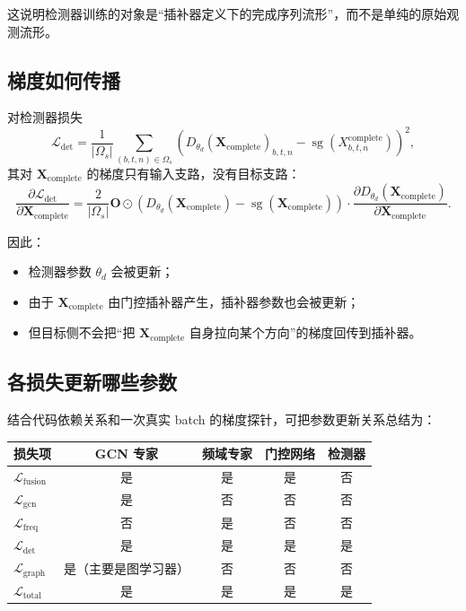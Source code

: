 \documentclass[UTF8]{ctexart}
\newcommand{\sg}{\operatorname{sg}}
\begin{document}
这说明检测器训练的对象是“插补器定义下的完成序列流形”，而不是单纯的原始观测流形。

\subsection{梯度如何传播}

对检测器损失
\begin{equation}
    \mathcal{L}_{\text{det}}
    =
    \frac{1}{|\Omega_s|}
    \sum_{(b,t,n)\in \Omega_s}
    \left(
        D_{\theta_d}(\bm{X}_{\text{complete}})_{b,t,n}
        -
        \sg(X^{\text{complete}}_{b,t,n})
    \right)^2,
\end{equation}
其对 \(\bm{X}_{\text{complete}}\) 的梯度只有输入支路，没有目标支路：
\begin{equation}
    \frac{\partial \mathcal{L}_{\text{det}}}{\partial \bm{X}_{\text{complete}}}
    =
    \frac{2}{|\Omega_s|}
    \bm{O}
    \odot
    \left(
        D_{\theta_d}(\bm{X}_{\text{complete}})
        -
        \sg(\bm{X}_{\text{complete}})
    \right)
    \cdot
    \frac{\partial D_{\theta_d}(\bm{X}_{\text{complete}})}{\partial \bm{X}_{\text{complete}}}.
\end{equation}

因此：
\begin{itemize}
    \item 检测器参数 \(\theta_d\) 会被更新；
    \item 由于 \(\bm{X}_{\text{complete}}\) 由门控插补器产生，插补器参数也会被更新；
    \item 但目标侧不会把“把 \(\bm{X}_{\text{complete}}\) 自身拉向某个方向”的梯度回传到插补器。
\end{itemize}

\subsection{各损失更新哪些参数}

结合代码依赖关系和一次真实 batch 的梯度探针，可把参数更新关系总结为：

\begin{center}
\small
\begin{tabular}{lcccc}
\toprule
损失项 & GCN 专家 & 频域专家 & 门控网络 & 检测器 \\
\midrule
\(\mathcal{L}_{\text{fusion}}\) & 是 & 是 & 是 & 否 \\
\(\mathcal{L}_{\text{gcn}}\) & 是 & 否 & 否 & 否 \\
\(\mathcal{L}_{\text{freq}}\) & 否 & 是 & 否 & 否 \\
\(\mathcal{L}_{\text{det}}\) & 是 & 是 & 是 & 是 \\
\(\mathcal{L}_{\text{graph}}\) & 是（主要是图学习器） & 否 & 否 & 否 \\
\(\mathcal{L}_{\text{total}}\) & 是 & 是 & 是 & 是 \\
\bottomrule
\end{tabular}
\end{center}
\end{document}
